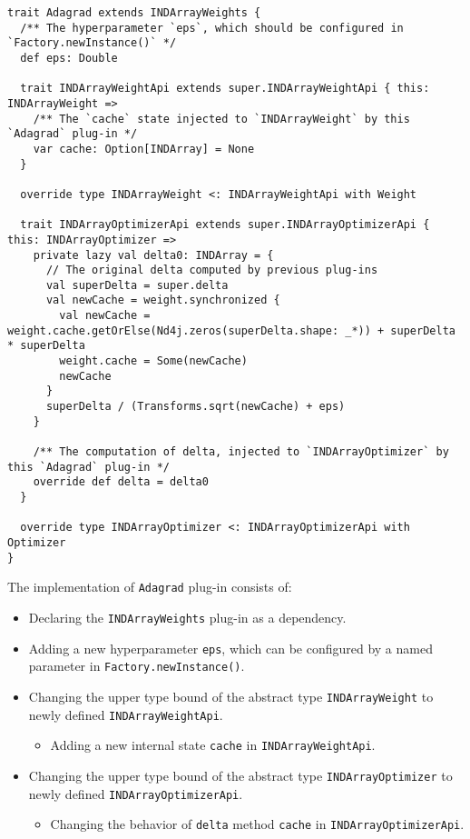 \begin{lstlisting}[float={htbp},caption={The implementation of the \lstinline{Adagrad} \gls{plug-in}}, label={Adagrad}]
trait Adagrad extends INDArrayWeights {
  /** The hyperparameter `eps`, which should be configured in `Factory.newInstance()` */
  def eps: Double

  trait INDArrayWeightApi extends super.INDArrayWeightApi { this: INDArrayWeight =>
    /** The `cache` state injected to `INDArrayWeight` by this `Adagrad` plug-in */
    var cache: Option[INDArray] = None
  }

  override type INDArrayWeight <: INDArrayWeightApi with Weight

  trait INDArrayOptimizerApi extends super.INDArrayOptimizerApi { this: INDArrayOptimizer =>
    private lazy val delta0: INDArray = {
      // The original delta computed by previous plug-ins
      val superDelta = super.delta
      val newCache = weight.synchronized {
        val newCache = weight.cache.getOrElse(Nd4j.zeros(superDelta.shape: _*)) + superDelta * superDelta
        weight.cache = Some(newCache)
        newCache
      }
      superDelta / (Transforms.sqrt(newCache) + eps)
    }

    /** The computation of delta, injected to `INDArrayOptimizer` by this `Adagrad` plug-in */
    override def delta = delta0
  }
  
  override type INDArrayOptimizer <: INDArrayOptimizerApi with Optimizer
}
\end{lstlisting}

The implementation of \lstinline{Adagrad} \gls{plug-in} consists of:

\begin{itemize}
  \item Declaring the \lstinline{INDArrayWeights} \gls{plug-in} as a dependency.
  \item Adding a new hyperparameter \lstinline{eps}, which can be configured by a named parameter in \lstinline{Factory.newInstance()}.
  \item Changing the upper type bound of the abstract type \lstinline{INDArrayWeight} to newly defined \lstinline{INDArrayWeightApi}.
  \begin{itemize}
    \item Adding a new internal state \lstinline{cache} in \lstinline{INDArrayWeightApi}.
  \end{itemize}
  \item Changing the upper type bound of the abstract type \lstinline{INDArrayOptimizer} to  newly defined \lstinline{INDArrayOptimizerApi}.
  \begin{itemize}
    \item Changing the behavior of \lstinline{delta} method \lstinline{cache} in \lstinline{INDArrayOptimizerApi}.
  \end{itemize}
\end{itemize}

